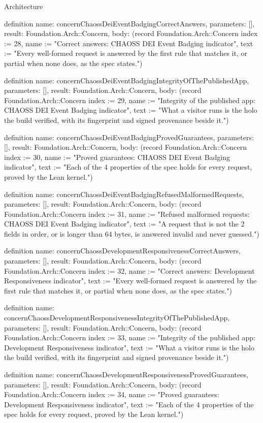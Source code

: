 \begin{lexlean}{Architecture}
\begin{semanticmodule}
definition{
  name: concernChaossDeiEventBadgingCorrectAnswers,
  parameters: [],
  result: Foundation.Arch::Concern,
  body: (record Foundation.Arch::Concern {index := 28, name := "Correct answers: CHAOSS DEI Event Badging indicator", text := "Every well-formed request is answered by the first rule that matches it, or partial when none does, as the spec states."})
}

definition{
  name: concernChaossDeiEventBadgingIntegrityOfThePublishedApp,
  parameters: [],
  result: Foundation.Arch::Concern,
  body: (record Foundation.Arch::Concern {index := 29, name := "Integrity of the published app: CHAOSS DEI Event Badging indicator", text := "What a visitor runs is the holo the build verified, with its fingerprint and signed provenance beside it."})
}

definition{
  name: concernChaossDeiEventBadgingProvedGuarantees,
  parameters: [],
  result: Foundation.Arch::Concern,
  body: (record Foundation.Arch::Concern {index := 30, name := "Proved guarantees: CHAOSS DEI Event Badging indicator", text := "Each of the 4 properties of the spec holds for every request, proved by the Lean kernel."})
}

definition{
  name: concernChaossDeiEventBadgingRefusedMalformedRequests,
  parameters: [],
  result: Foundation.Arch::Concern,
  body: (record Foundation.Arch::Concern {index := 31, name := "Refused malformed requests: CHAOSS DEI Event Badging indicator", text := "A request that is not the 2 fields in order, or is longer than 64 bytes, is answered invalid and never guessed."})
}

definition{
  name: concernChaossDevelopmentResponsivenessCorrectAnswers,
  parameters: [],
  result: Foundation.Arch::Concern,
  body: (record Foundation.Arch::Concern {index := 32, name := "Correct answers: Development Responsiveness indicator", text := "Every well-formed request is answered by the first rule that matches it, or partial when none does, as the spec states."})
}

definition{
  name: concernChaossDevelopmentResponsivenessIntegrityOfThePublishedApp,
  parameters: [],
  result: Foundation.Arch::Concern,
  body: (record Foundation.Arch::Concern {index := 33, name := "Integrity of the published app: Development Responsiveness indicator", text := "What a visitor runs is the holo the build verified, with its fingerprint and signed provenance beside it."})
}

definition{
  name: concernChaossDevelopmentResponsivenessProvedGuarantees,
  parameters: [],
  result: Foundation.Arch::Concern,
  body: (record Foundation.Arch::Concern {index := 34, name := "Proved guarantees: Development Responsiveness indicator", text := "Each of the 4 properties of the spec holds for every request, proved by the Lean kernel."})
}


\end{semanticmodule}
\end{lexlean}
